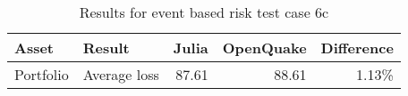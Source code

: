 \begin{table}[htbp]

\centering
\begin{tabular}{ l l r r r }

\hline
\rowcolor{anti-flashwhite}
\bf{Asset} & \bf{Result} & \bf{Julia} & \bf{OpenQuake} & \bf{Difference}\\
\hline
Portfolio & Average loss & 87.61 & 88.61 & 1.13\% \\
\hline
\end{tabular}

\caption{Results for event based risk test case 6c}
\label{tab:result-ebr-6c}
\end{table}